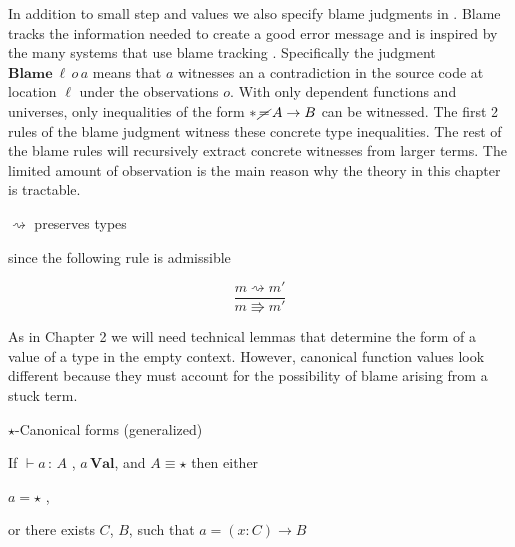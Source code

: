 In addition to small step and values we also specify blame judgments in .
Blame tracks the information needed to create a good error message and is inspired by the many systems that use blame tracking \cite{10.1145/581478.581484,10.1007/978-3-642-00590-9_1,wadler:LIPIcs:2015:5033}.
Specifically the judgment $\textbf{Blame}\:\ell \,o\,a$ means that $a$ witnesses an a contradiction in the source code at location $\ell $ under the observations $o$.
With only dependent functions and universes, only inequalities of the form $*\,\cancel{=}\,A\rightarrow B$ can be witnessed.
The first 2 rules of the blame judgment witness these concrete type inequalities.
The rest of the blame rules will recursively extract concrete witnesses from larger terms.
The limited amount of observation is the main reason why the theory in this chapter is tractable.
\begin{fact}
$\rightsquigarrow$ preserves types 

since the following rule is admissible
\end{fact}

\[
\frac{m\rightsquigarrow m'}{m\Rrightarrow m'}
\]

As in Chapter 2 we will need technical lemmas that determine the form of a value of a type in the empty context.
However, canonical function values look different because they must account for the possibility of blame arising from a stuck term.
\begin{lem}
$\star$-Canonical forms (generalized)

If $\vdash a\,:\,A$ , $a\,\textbf{Val}$, and $A\equiv\star$ then
either

\textup{$a=\star$ ,}

\textup{or there exists $C$, $B$, such that $a=\left(x:C\right)\rightarrow B$}
\end{lem}

